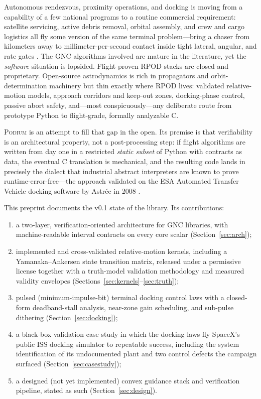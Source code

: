 \documentclass[11pt]{article}
\newcommand{\podium}{\textsc{Podium}}
\begin{document}
Autonomous rendezvous, proximity operations, and docking is moving from a
capability of a few national programs to a routine commercial requirement:
satellite servicing, active debris removal, orbital assembly, and crew and
cargo logistics all fly some version of the same terminal problem---bring a
chaser from kilometers away to millimeter-per-second contact inside tight
lateral, angular, and rate gates \cite{fehse2003}. The GNC algorithms
involved are mature in the literature, yet the \emph{software} situation is
lopsided. Flight-proven RPOD stacks are closed and proprietary. Open-source
astrodynamics is rich in propagators and orbit-determination machinery but
thin exactly where RPOD lives: validated relative-motion models, approach
corridors and keep-out zones, docking-phase control, passive abort safety,
and---most conspicuously---any deliberate route from prototype Python to
flight-grade, formally analyzable C.

\podium{} \cite{podium2026} is an attempt to fill that gap in the open. Its
premise is that verifiability is an architectural property, not a
post-processing step: if flight algorithms are written from day one in a
restricted \emph{static subset} of Python with contracts as data, the
eventual C translation is mechanical, and the resulting code lands in
precisely the dialect that industrial abstract interpreters are known to
prove runtime-error-free---the approach validated on the ESA Automated
Transfer Vehicle docking software by Astr\'ee in 2008 \cite{kastner2010}.

This preprint documents the v0.1 state of the library. Its contributions:

\begin{enumerate}
  \item a two-layer, verification-oriented architecture for GNC libraries,
        with machine-readable interval contracts on every core scalar
        (Section~\ref{sec:arch});
  \item implemented and cross-validated relative-motion kernels, including
        a Yamanaka--Ankersen state transition matrix, released under a
        permissive license together with a truth-model validation
        methodology and measured validity envelopes (Sections~\ref{sec:kernels}--\ref{sec:truth});
  \item pulsed (minimum-impulse-bit) terminal docking control laws with a
        closed-form deadband-stall analysis, near-zone gain scheduling, and
        sub-pulse dithering (Section~\ref{sec:docking});
  \item a black-box validation case study in which the docking laws fly
        SpaceX's public ISS docking simulator to repeatable success,
        including the system identification of its undocumented plant and
        two control defects the campaign surfaced (Section~\ref{sec:casestudy});
  \item a designed (not yet implemented) convex guidance stack and
        verification pipeline, stated as such (Section~\ref{sec:design}).
\end{enumerate}
\end{document}
